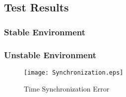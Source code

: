 \documentclass[Main]{subfiles}
\begin{document}
	\subsection{Test Results} %
	\label{sub:test_results}

		\subsubsection{Stable Environment} %
		\label{sub:stable_environment}
		

		\subsubsection{Unstable Environment} %
		\label{sub:unstable_environment}
			
			\begin{figure}[H]
				\centering
				\texttt{[image: Synchronization.eps]}
				\caption{Time Synchronization Error}
				\label{fig:Synchronization}
			\end{figure}

	

\end{document}
